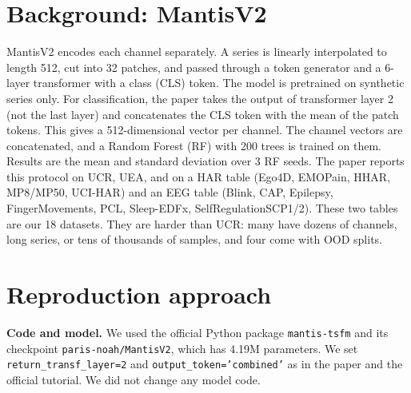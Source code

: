 \documentclass[conference]{IEEEtran}
\begin{document}
\section{Background: MantisV2}

MantisV2 encodes each channel separately. A series is linearly interpolated to length 512, cut into 32 patches,
and passed through a token generator and a 6-layer transformer with a class (CLS) token. The model is pretrained on
synthetic series only. For classification, the paper takes the output of transformer layer 2 (not the last layer)
and concatenates the CLS token with the mean of the patch tokens. This gives a 512-dimensional vector per channel.
The channel vectors are concatenated, and a Random Forest (RF) \cite{rf} with 200 trees is trained on them. Results are the mean
and standard deviation over 3 RF seeds. The paper reports this protocol on UCR, UEA, and on a HAR table (Ego4D,
EMOPain, HHAR, MP8/MP50, UCI-HAR) and an EEG table (Blink, CAP, Epilepsy, FingerMovements, PCL, Sleep-EDFx,
SelfRegulationSCP1/2). These two tables are our 18 datasets. They are harder than UCR: many have dozens of channels,
long series, or tens of thousands of samples, and four come with OOD splits.

\section{Reproduction approach}\label{sec:repro}

\textbf{Code and model.} We used the official Python package \texttt{mantis-tsfm} and its checkpoint
\texttt{paris-noah/MantisV2}, which has 4.19M parameters. We set \texttt{return\_transf\_layer=2} and
\texttt{output\_token='combined'} as in the paper and the official tutorial. We did not change any model code.
\end{document}
